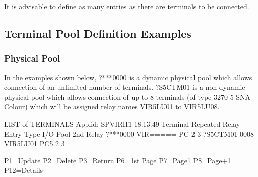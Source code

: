 \documentclass[letterpaper,10pt,english]{sphinxmanual}
\begin{document}
It is advisable to define as many entries as there are terminals to be connected.

\ignorespaces 

\subsection{Terminal Pool Definition Examples}
\label{\detokenize{connectivity_guide:terminal-pool-definition-examples}}\label{\detokenize{connectivity_guide:index-142}}

\subsubsection{Physical Pool}
\label{\detokenize{connectivity_guide:physical-pool}}
In the examples shown below, ?***0000 is a dynamic physical pool which allows connection of an unlimited number of terminals. ?S5CTM01 is a non-dynamic physical pool which allows connection of up to 8 terminals (of type 3270-5 SNA Colour) which will be assigned relay names VIR5LU01 to VIR5LU08.

\begin{sphinxVerbatim}[commandchars=\\\{\}]
LIST of TERMINALS \PYGZhy{}\PYGZhy{}\PYGZhy{}\PYGZhy{}\PYGZhy{}\PYGZhy{}\PYGZhy{}\PYGZhy{}\PYGZhy{}\PYGZhy{}\PYGZhy{}\PYGZhy{}\PYGZhy{}\PYGZhy{}\PYGZhy{}\PYGZhy{}\PYGZhy{}\PYGZhy{}\PYGZhy{}\PYGZhy{}\PYGZhy{}\PYGZhy{}\PYGZhy{}\PYGZhy{}\PYGZhy{}\PYGZhy{}\PYGZhy{}\PYGZhy{}\PYGZhy{}\PYGZhy{}\PYGZhy{}\PYGZhy{}\PYGZhy{}\PYGZhy{} Applid: SPVIRH1 18:13:49
Terminal Repeated   Relay    Entry   Type I/O Pool 2nd Relay
?***0000            VIR===== PC      2    3
?S5CTM01 0008       VIR5LU01 PC5     2    3


P1=Update           P2=Delete        P3=Return         P6=1st Page
P7=Page\PYGZhy{}1           P8=Page+1        P12=Details
\end{sphinxVerbatim}

\end{document}
